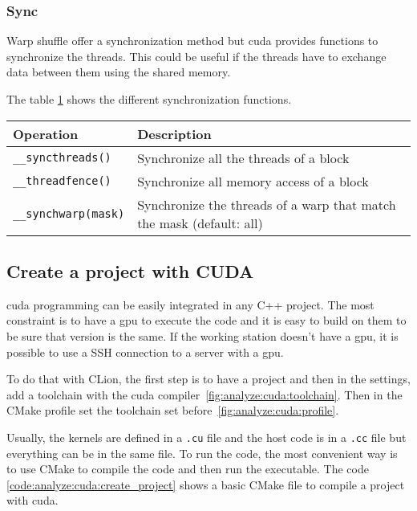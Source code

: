 \subsubsection{Sync}
\label{ch:analyze:cuda:synchronization:sync}

Warp shuffle offer a synchronization method but \acrshort{cuda} provides
functions to synchronize the threads.
This could be useful if the threads have to exchange data between them using
the shared memory.

The table \ref{tab:analyze:cuda:synchronization:sync} shows the different
synchronization functions.

\begin{table}[ht]
    \centering
    \begin{tabular}{|m{}|m{}|}
        \hline
        \textbf{Operation} & \textbf{Description} \\
        \hline
        \texttt{\_\_syncthreads()} & Synchronize all the threads of a block\\
        \hline
        \texttt{\_\_threadfence()} & Synchronize all memory access of a block\\
        \hline
        \texttt{\_\_synchwarp(mask)} & Synchronize the threads of a warp that match the mask (default: all)\\
        \hline
    \end{tabular}
    \label{tab:analyze:cuda:synchronization:sync}
\end{table}


\subsection{Create a project with CUDA}
\label{ch:analyze:cuda:create_project}

\acrshort{cuda} programming can be easily integrated in any C++ project.
The most constraint is to have a \acrshort{gpu} to execute the code and it is
easy to build on them to be sure that version is the same.
If the working station doesn't have a \acrshort{gpu}, it is possible to use a
SSH connection to a server with a \acrshort{gpu}.

To do that with CLion, the first step is to have a project and then in the
settings, add a toolchain with the \acrshort{cuda} compiler~\ref{fig:analyze:cuda:toolchain}.
Then in the CMake profile set the toolchain set before~\ref{fig:analyze:cuda:profile}.

Usually, the kernels are defined in a \texttt{.cu} file and the host code is in
a \texttt{.cc} file but everything can be in the same file.
To run the code, the most convenient way is to use CMake to compile the code
and then run the executable.
The code \ref{code:analyze:cuda:create_project} shows a basic CMake file to
compile a project with \acrshort{cuda}.

